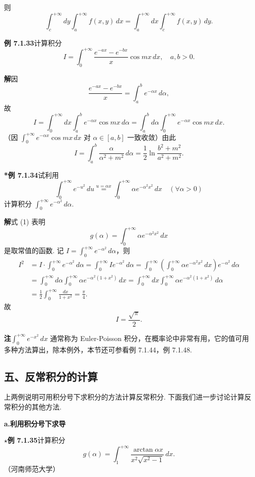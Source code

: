 \documentclass[UTF8, 12pt, fontset=fandol, oneside]{ctexart}
\begin{document}
则
\[
\int_c^{+\infty}dy\int_a^{+\infty}f(x,y)\,dx
=\int_a^{+\infty}dx\int_c^{+\infty}f(x,y)\,dy.
\]

\noindent\textbf{例 7.1.33}\quad 计算积分
\[
I=\int_0^{+\infty}\frac{e^{-ax}-e^{-bx}}x\cos mx\,dx,\quad a,b>0.
\]

\noindent\textbf{解}\quad 因
\[
\frac{e^{-ax}-e^{-bx}}x=\int_a^b e^{-\alpha x}\,d\alpha,
\]
故
\[
I=\int_0^{+\infty}dx\int_a^b e^{-\alpha x}\cos mx\,d\alpha
=\int_a^b d\alpha\int_0^{+\infty}e^{-\alpha x}\cos mx\,dx.
\]
（因 $\displaystyle\int_0^{+\infty}e^{-\alpha x}\cos mx\,dx$ 对 $\alpha\in[a,b]$ 一致收敛）由此
\[
I=\int_a^b\frac{\alpha}{\alpha^2+m^2}\,d\alpha
=\frac12\ln\frac{b^2+m^2}{a^2+m^2}.
\]

\noindent\textbf{*例 7.1.34}\quad 试利用
\[
\int_0^{+\infty}e^{-u^2}\,du
\overset{u=\alpha x}{=}\int_0^{+\infty}\alpha e^{-\alpha^2x^2}\,dx\quad(\forall\alpha>0)
\tag{1}
\]
计算积分 $\displaystyle\int_0^{+\infty}e^{-\alpha^2}\,d\alpha$.

\noindent\textbf{解}\quad 式 (1) 表明
\[
g(\alpha)=\int_0^{+\infty}\alpha e^{-\alpha^2x^2}\,dx
\]
是取常值的函数. 记 $I=\displaystyle\int_0^{+\infty}e^{-\alpha^2}\,d\alpha$，则
\[
\begin{aligned}
I^2
&=I\cdot\int_0^{+\infty}e^{-\alpha^2}\,d\alpha
=\int_0^{+\infty}Ie^{-\alpha^2}\,d\alpha
=\int_0^{+\infty}\left(\int_0^{+\infty}\alpha e^{-\alpha^2x^2}\,dx\right)e^{-\alpha^2}\,d\alpha\\
&=\int_0^{+\infty}d\alpha\int_0^{+\infty}\alpha e^{-\alpha^2(1+x^2)}\,dx
=\int_0^{+\infty}dx\int_0^{+\infty}\alpha e^{-\alpha^2(1+x^2)}\,d\alpha\\
&=\frac12\int_0^{+\infty}\frac{dx}{1+x^2}
=\frac{\pi}{4}.
\end{aligned}
\]
故
\[
I=\frac{\sqrt\pi}{2}.
\]

\noindent\textbf{注}\quad $\displaystyle\int_0^{+\infty}e^{-x^2}\,dx$ 通常称为 Euler-Poisson 积分，在概率论中非常有用，它的值可用多种方法算出，除本例外，本节还可参看例 7.1.44，例 7.1.48.

\subsection*{五、反常积分的计算}

上两例说明可用积分号下求积分的方法计算反常积分. 下面我们进一步讨论计算反常积分的其他方法.

\noindent\textbf{a.\quad 利用积分号下求导}

\noindent\textbf{$\star$例 7.1.35}\quad 计算积分
\[
g(\alpha)=\int_1^{+\infty}\frac{\arctan\alpha x}{x^2\sqrt{x^2-1}}\,dx.
\]
（河南师范大学）
\end{document}
